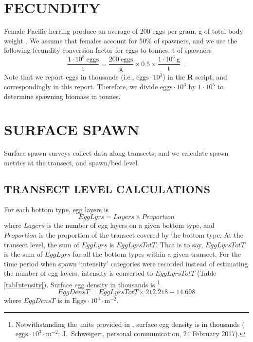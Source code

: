 \documentclass[12pt]{article}
\begin{document}
\section{FECUNDITY}\label{secFecund}

Female Pacific herring produce an average of 200 eggs per gram, g of total body weight \citep{Hay1985}.
We assume that females account for 50\% of spawners, and we use the following fecundity conversion factor for eggs to tonnes, t of spawners
\begin{equation}
\frac {1 \cdot 10^{8}~\text{eggs}} {\text{t}} = \frac{200~\text{eggs}} {\text{g}} \times 0.5 \times \frac{1 \cdot 10^{6}~\text{g}} {\text{t}} \enspace .
\label{eqFecundityConv}
\end{equation}
Note that we report eggs in thousands (i.e., $\text{eggs} \cdot 10^{3}$) in the \textbf{R} script, and correspondingly in this report.
Therefore, we divide $\text{eggs} \cdot 10^{3}$ by $1 \cdot 10^{5}$ to determine spawning biomass in tonnes.

\section{SURFACE SPAWN}\label{secSurf}

Surface spawn surveys collect data along transects, and we calculate spawn metrics at the transect, and spawn/bed level.

\subsection{TRANSECT LEVEL CALCULATIONS}

For each bottom type, egg layers is
\begin{equation}
EggLyrs = Layers \times Proportion
\label{eqEggLayersSurf}
\end{equation}
where $Layers$ is the number of egg layers on a given bottom type, and $Proportion$ is the proportion of the transect covered by the bottom type.
At the transect level, the sum of $EggLyrs$ is $EggLyrsTotT$.
That is to say, $EggLyrsTotT$ is the sum of $EggLyrs$ for all the bottom types within a given transect.
For the time period when spawn `intensity' categories were recorded instead of estimating the number of egg layers, intensity is converted to $EggLyrsTotT$ (Table \ref{tabIntensity}).
Surface egg density in thousands is \citep{SchweigertEtal1997}%
\footnote{Notwithstanding the units provided in \cite{SchweigertEtal1997}, surface egg density is in thousands ($\text{eggs} \cdot 10^{3} \cdot \text{m}^{-2}$; J.~Schweigert, personal communication, 24 February 2017).}
\begin{equation}
EggDensT = EggLyrsTotT \times 212.218 + 14.698
\label{eqEggDensSurf}
\end{equation}
where $EggDensT$ is in $\text{Eggs} \cdot 10^{3} \cdot \text{m}^{-2}$. 
\end{document}
